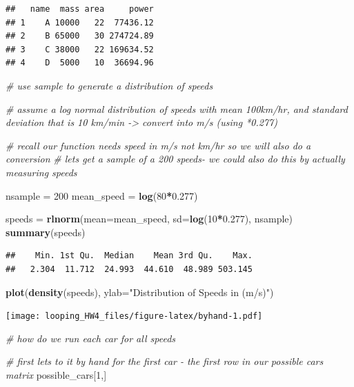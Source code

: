 \documentclass[
]{article}
\newenvironment{Shaded}{\begin{snugshade}}{\end{snugshade}}
\newcommand{\AttributeTok}[1]{\textcolor[rgb]{0.13,0.29,0.53}{#1}}
\newcommand{\CommentTok}[1]{\textcolor[rgb]{0.56,0.35,0.01}{\textit{#1}}}
\newcommand{\DecValTok}[1]{\textcolor[rgb]{0.00,0.00,0.81}{#1}}
\newcommand{\FloatTok}[1]{\textcolor[rgb]{0.00,0.00,0.81}{#1}}
\newcommand{\FunctionTok}[1]{\textcolor[rgb]{0.13,0.29,0.53}{\textbf{#1}}}
\newcommand{\NormalTok}[1]{#1}
\newcommand{\OtherTok}[1]{\textcolor[rgb]{0.56,0.35,0.01}{#1}}
\newcommand{\SpecialCharTok}[1]{\textcolor[rgb]{0.81,0.36,0.00}{\textbf{#1}}}
\newcommand{\StringTok}[1]{\textcolor[rgb]{0.31,0.60,0.02}{#1}}
\begin{document}
\begin{verbatim}
##   name  mass area     power
## 1    A 10000   22  77436.12
## 2    B 65000   30 274724.89
## 3    C 38000   22 169634.52
## 4    D  5000   10  36694.96
\end{verbatim}

\begin{Shaded}
\begin{Highlighting}[]
\CommentTok{\# use sample to generate a distribution of speeds}

\CommentTok{\# assume a log normal distribution of speeds with mean 100km/hr, and standard deviation that is 10 km/min {-}\textgreater{} convert into m/s (using *0.277)}

\CommentTok{\# recall our function needs speed in m/s not km/hr so we will also do a conversion}
\CommentTok{\# lets get a sample of a 200 speeds{-} we could also do this by actually measuring speeds}

\NormalTok{nsample }\OtherTok{=} \DecValTok{200}
\NormalTok{mean\_speed }\OtherTok{=} \FunctionTok{log}\NormalTok{(}\DecValTok{80}\SpecialCharTok{*}\FloatTok{0.277}\NormalTok{)}

\NormalTok{speeds }\OtherTok{=} \FunctionTok{rlnorm}\NormalTok{(}\AttributeTok{mean=}\NormalTok{mean\_speed, }\AttributeTok{sd=}\FunctionTok{log}\NormalTok{(}\DecValTok{10}\SpecialCharTok{*}\FloatTok{0.277}\NormalTok{), nsample)}
\FunctionTok{summary}\NormalTok{(speeds)}
\end{Highlighting}
\end{Shaded}

\begin{verbatim}
##    Min. 1st Qu.  Median    Mean 3rd Qu.    Max. 
##   2.304  11.712  24.993  44.610  48.989 503.145
\end{verbatim}

\begin{Shaded}
\begin{Highlighting}[]
\FunctionTok{plot}\NormalTok{(}\FunctionTok{density}\NormalTok{(speeds), }\AttributeTok{ylab=}\StringTok{"Distribution of Speeds in (m/s)"}\NormalTok{)}
\end{Highlighting}
\end{Shaded}

\texttt{[image: looping\_HW4\_files/figure-latex/byhand-1.pdf]}

\begin{Shaded}
\begin{Highlighting}[]
\CommentTok{\# how do we run each car for all speeds }

\CommentTok{\# first lets to it by hand for the first car {-} the first row in our possible cars matrix}
\NormalTok{possible\_cars[}\DecValTok{1}\NormalTok{,]}
\end{Highlighting}
\end{Shaded}
\end{document}
